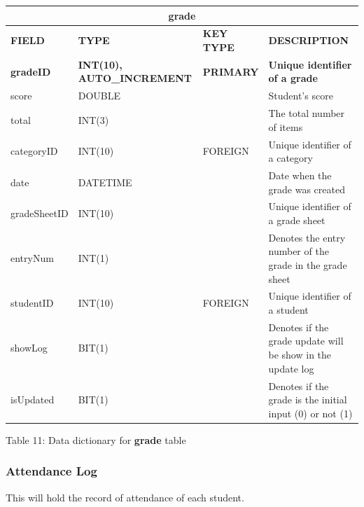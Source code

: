 \documentclass[11pt,a4paper,titlepage]{article}
\begin{document}
\vspace{1cm}
\begin{longtable}{ |p{2.5cm}|p{4.5cm}|p{2.5cm}|p{3cm}|  }
    \hline
    \multicolumn{4}{|c|}{\textbf{grade}} \\
    \hline
    \textbf{FIELD}&\textbf{TYPE}&\textbf{KEY TYPE}&\textbf{DESCRIPTION}\\
    \hline
    \textbf{gradeID}  & \textbf{INT(10), AUTO\_INCREMENT} & \textbf{PRIMARY} & \textbf{Unique identifier of a grade}\\ \hline
    score   & DOUBLE   & & Student's score \\ \hline
    total   & INT(3)   & & The total number of items \\ \hline
    categoryID   & INT(10)   & FOREIGN & Unique identifier of a category \\ \hline
    date   & DATETIME   & & Date when the grade was created \\ \hline
    gradeSheetID   & INT(10)   & & Unique identifier of a grade sheet \\ \hline
    entryNum   & INT(1)   & & Denotes the entry number of the grade in the grade sheet \\ \hline
    studentID   & INT(10)   & FOREIGN & Unique identifier of a student \\ \hline
    showLog & BIT(1) & &  Denotes if the grade update will be show in the update log \\ \hline
    isUpdated & BIT(1) & & Denotes if the grade is the initial input (0) or not (1) \\ \hline
\end{longtable}
    
\vspace{.5cm}
\begin{center}
    Table 11: Data dictionary for \textbf{grade} table
\end{center}

\newpage

\subsubsection{Attendance Log}

This will hold the record of attendance of each student.
\end{document}
